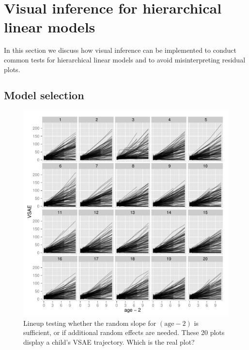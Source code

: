 \documentclass{article} %
\begin{document}

\section{Visual inference for hierarchical linear models}

In this section we discuss how visual inference can be implemented to conduct common tests for hierarchical linear models and to avoid misinterpreting residual plots. 


\subsection{Model selection}





\begin{figure}
	\centering
	\includegraphics[width=\textwidth]{ranef1_lineup3.pdf}
	\caption{\label{fig:lineup-ranef1} Lineup testing whether the random slope for $(\text{age} - 2)$ is sufficient, or if additional random effects are needed. These 20 plots display a child's VSAE trajectory. Which is the real plot?}
\end{figure}
\end{document}

